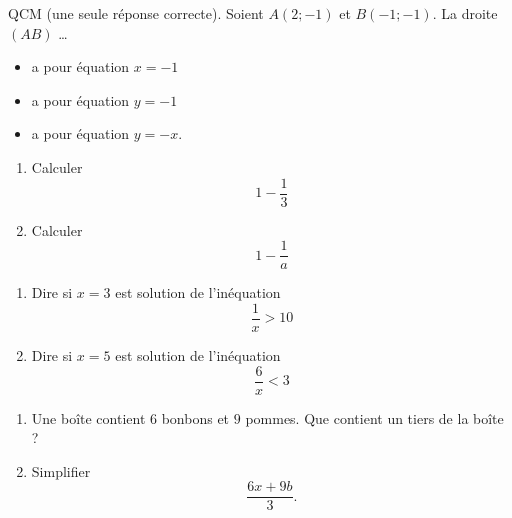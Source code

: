 \begin{MentalActivity}

\begin{mental}
            QCM (une seule réponse correcte). Soient \( A(2;-1)\) et \( B(-1;-1)\). La droite \( (AB)\) \ldots
            \begin{itemize}
                \item
                    a pour équation \( x=-1\)
                \item
                    a pour équation \( y=-1\)
                \item
                    a pour équation \( y=-x\).
            \end{itemize}
\end{mental}

\begin{mental}
    \begin{enumerate}
        \item
            Calculer 
            \begin{equation*}
                1- \frac{1}{ 3 }
            \end{equation*}
        \item
            Calculer 
            \begin{equation*}
                1- \frac{1}{ a }
            \end{equation*}
    \end{enumerate}

\end{mental}


\begin{mental}
    \begin{enumerate}
        \item
            Dire si \( x=3\) est solution de l'inéquation
            \begin{equation*}
                \frac{1}{ x }>10
            \end{equation*}
        \item
            Dire si \( x=5\) est solution de l'inéquation
            \begin{equation*}
                \frac{ 6 }{ x }<3
            \end{equation*}
    \end{enumerate}
\end{mental}

\begin{mental}
    \begin{enumerate}
        \item
            Une boîte contient \( 6\) bonbons et \( 9\) pommes. Que contient un tiers de la boîte ?
        \item
            Simplifier
            \begin{equation*}
                \frac{ 6x+9b }{ 3 }.
            \end{equation*}
    \end{enumerate}
\end{mental}


\end{MentalActivity}
